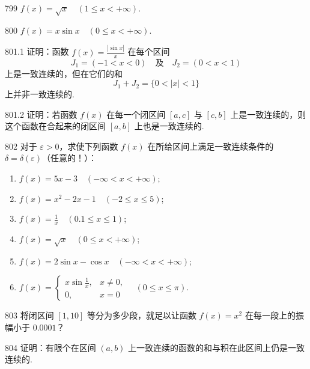 \begin{prob}[S]{799}
$f(x) = \sqrt{x} \quad (1 \leqslant x < +\infty).$
\end{prob}

\begin{prob}[S]{800}
$f(x) = x \sin x \quad (0 \leqslant x < +\infty).$
\end{prob}

\begin{prob}[M]{801.1}
证明：函数 $f(x) = \frac{|\sin x|}{x}$ 在每个区间
\[
J_1 = (-1 < x < 0) \quad \text{及} \quad J_2 = (0 < x < 1)
\]
上是一致连续的，但在它们的和
\[
J_1 + J_2 = \{0 < |x| < 1\}
\]
上并非一致连续的.
\end{prob}

\begin{prob}[M]{801.2}
证明：若函数 $f(x)$ 在每一个闭区间 $[a, c]$ 与 $[c, b]$ 上是一致连续的，则这个函数在合起来的闭区间 $[a, b]$ 上也是一致连续的.
\end{prob}

\begin{prob}[L]{802}
对于 $\varepsilon > 0$，求使下列函数 $f(x)$ 在所给区间上满足一致连续条件的 $\delta = \delta(\varepsilon)$（任意的！）：
\begin{enumerate}[label=(\alph*), itemsep=2pt, topsep=3pt]
    \item $f(x) = 5x - 3 \quad (-\infty < x < +\infty)$;
    \item $f(x) = x^2 - 2x - 1 \quad (-2 \leqslant x \leqslant 5)$;
    \item $f(x) = \frac{1}{x} \quad (0.1 \leqslant x \leqslant 1)$;
    \item $f(x) = \sqrt{x} \quad (0 \leqslant x < +\infty)$;
    \item $f(x) = 2\sin x - \cos x \quad (-\infty < x < +\infty)$;
    \item $f(x) = \begin{cases} x \sin \frac{1}{x}, & x \neq 0, \\ 0, & x = 0 \end{cases} \quad (0 \leqslant x \leqslant \pi).$
\end{enumerate}
\end{prob}

\begin{prob}[M]{803}
将闭区间 $[1, 10]$ 等分为多少段，就足以让函数 $f(x) = x^2$ 在每一段上的振幅小于 $0.0001$？
\end{prob}

\begin{prob}[M]{804}
证明：有限个在区间 $(a, b)$ 上一致连续的函数的和与积在此区间上仍是一致连续的.
\end{prob}

